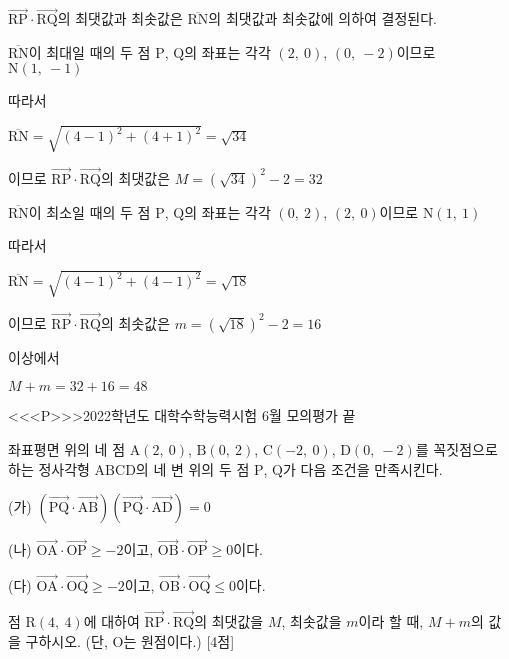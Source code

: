 \documentclass{oblivoir}
\begin{document}
$\overrightarrow{\mathrm{RP}}\cdot\overrightarrow{\mathrm{RQ}}$의 최댓값과 최솟값은 $\overline{\mathrm{RN}}$의 최댓값과 최솟값에 의하여 결정된다.

$\overline{\mathrm{RN}}$이 최대일 때의 두 점 $\mathrm{P}$, $\mathrm{Q}$의 좌표는 각각 $(2,\:  0)$, $(0,\:  -2)$이므로 $\mathrm{N}(1,\: -1)$

따라서 

$\overline{\mathrm{RN}} =\sqrt{(4-1)^{2}+(4+1)^{2}}=\sqrt{34}$

이므로 $\overrightarrow{\mathrm{RP}}\cdot\overrightarrow{\mathrm{RQ}}$의 최댓값은 $M=(\sqrt{34})^{2}- 2 = 32$

$\overline{\mathrm{RN}}$이 최소일 때의 두 점 $\mathrm{P}$, $\mathrm{Q}$의 좌표는 각각 $(0,\:  2)$, $(2,\:  0)$이므로 $\mathrm{N}(1,\: 1)$

따라서 

$\overline{\mathrm{RN}} =\sqrt{(4-1)^{2}+(4-1)^{2}}=\sqrt{18}$

이므로 $\overrightarrow{\mathrm{RP}}\cdot\overrightarrow{\mathrm{RQ}}$의 최솟값은 $m=(\sqrt{18})^{2}- 2 = 16$

이상에서 

$M + m = 32+ 16 = 48$

<<<P>>>2022학년도 대학수학능력시험 6월 모의평가 끝

좌표평면 위의 네 점 $\mathrm{A}(2,\: 0)$, $\mathrm{B}(0,\:  2)$, $\mathrm{C}(-2,\: 0)$, $\mathrm{D}(0,\: -2)$를 꼭짓점으로 하는 정사각형 $\mathrm{ABCD}$의 네 변 위의 두 점 $\mathrm{P}$, $\mathrm{Q}$가 다음 조건을 만족시킨다.

(가) $(\overrightarrow{\mathrm{PQ}}\cdot\overrightarrow{\mathrm{AB}})(\overrightarrow{\mathrm{PQ}}\cdot\overrightarrow{\mathrm{AD}})= 0$

(나) $\overrightarrow{\mathrm{OA}}\cdot\overrightarrow{\mathrm{OP}}\ge -2$이고, $\overrightarrow{\mathrm{OB}}\cdot\overrightarrow{\mathrm{OP}}\ge 0$이다.

(다) $\overrightarrow{\mathrm{OA}}\cdot\overrightarrow{\mathrm{OQ}}\ge -2$이고, $\overrightarrow{\mathrm{OB}}\cdot\overrightarrow{\mathrm{OQ}}\le 0$이다.

점 $\mathrm{R}(4,\: 4)$에 대하여 $\overrightarrow{\mathrm{RP}}\cdot\overrightarrow{\mathrm{RQ}}$의 최댓값을 $M$, 최솟값을 $m$이라 할 때, $M+m$의 값을 구하시오. (단, $\mathrm{O}$는 원점이다.) [4점]
\end{document}
